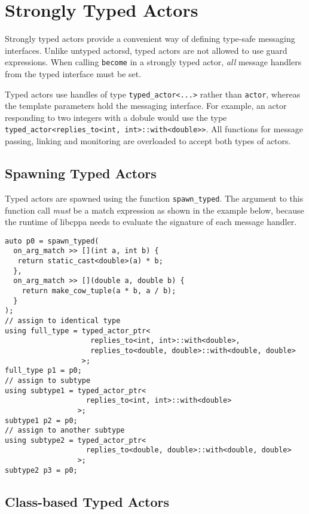\section{Strongly Typed Actors}

Strongly typed actors provide a convenient way of defining type-safe messaging interfaces.
Unlike untyped actorsd, typed actors are not allowed to use guard expressions.
When calling \lstinline^become^ in a strongly typed actor, \emph{all} message handlers from the typed interface must be set.

Typed actors use handles of type \lstinline^typed_actor<...>^ rather than \lstinline^actor^, whereas the template parameters hold the messaging interface.
For example, an actor responding to two integers with a dobule would use the type \lstinline^typed_actor<replies_to<int, int>::with<double>>^.
All functions for message passing, linking and monitoring are overloaded to accept both types of actors.

\subsection{Spawning Typed Actors}
\label{sec:strong:spawn}

Typed actors are spawned using the function \lstinline^spawn_typed^.
The argument to this function call \emph{must} be a match expression as shown in the example below, because the runtime of libcppa needs to evaluate the signature of each message handler.

\begin{lstlisting}
auto p0 = spawn_typed(
  on_arg_match >> [](int a, int b) {
   return static_cast<double>(a) * b;
  },
  on_arg_match >> [](double a, double b) {
    return make_cow_tuple(a * b, a / b);
  }
);
// assign to identical type
using full_type = typed_actor_ptr<
                    replies_to<int, int>::with<double>,
                    replies_to<double, double>::with<double, double>
                  >;
full_type p1 = p0;
// assign to subtype
using subtype1 = typed_actor_ptr<
                   replies_to<int, int>::with<double>
                 >;
subtype1 p2 = p0;
// assign to another subtype
using subtype2 = typed_actor_ptr<
                   replies_to<double, double>::with<double, double>
                 >;
subtype2 p3 = p0;
\end{lstlisting}

\clearpage
\subsection{Class-based Typed Actors}

